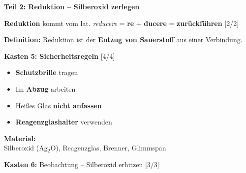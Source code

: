 \documentclass[10pt, a4paper]{article}
\newcommand{\lsg}[1]{\textcolor{loesung}{\textbf{#1}}}
\newcommand{\punktebox}[1]{\hfill\small\textcolor{mittelgrau}{[#1/#1]}}
\newcommand{\kasten}[2]{%
    \vspace{4pt}%
    \noindent\textbf{\textcolor{fachfarbe}{Kasten #1:}} #2%
    \vspace{2pt}%
    \nopagebreak[4]%
}
\begin{document}
\vspace{2pt}


\begin{teilbox}
\textbf{\textcolor{fachfarbe}{Teil 2: Reduktion – Silberoxid zerlegen}}
\end{teilbox}

\vspace{-2pt}

\begin{merkkasten}
\textbf{Reduktion} kommt vom lat. \textit{reducere} = \lsg{re} + \lsg{ducere} = \lsg{zurückführen} \punktebox{2}

\vspace{3pt}
\textbf{Definition:} Reduktion ist der \lsg{Entzug von Sauerstoff} aus einer Verbindung.
\end{merkkasten}

\begin{sicherheitsbox}
\textbf{\textcolor{warnung}{Kasten 5: Sicherheitsregeln}} \punktebox{4}

\vspace{2pt}
\begin{minipage}[t]{0.6\textwidth}
\begin{itemize}[leftmargin=1.3em, itemsep=3pt]
    \item[\textcolor{warnung}{\textbf{!}}] \lsg{Schutzbrille} tragen
    \item[\textcolor{warnung}{\textbf{!}}] Im \lsg{Abzug} arbeiten
    \item[\textcolor{warnung}{\textbf{!}}] Heißes Glas \lsg{nicht anfassen}
    \item[\textcolor{warnung}{\textbf{!}}] \lsg{Reagenzglashalter} verwenden
\end{itemize}
\end{minipage}%
\hfill
\begin{minipage}[t]{0.35\textwidth}
\centering
\textbf{Material:}\\
{\footnotesize Silberoxid (Ag$_2$O), Reagenzglas, Brenner, Glimmspan}
\end{minipage}
\end{sicherheitsbox}

\kasten{6}{Beobachtung – Silberoxid erhitzen} \punktebox{3}
\end{document}
